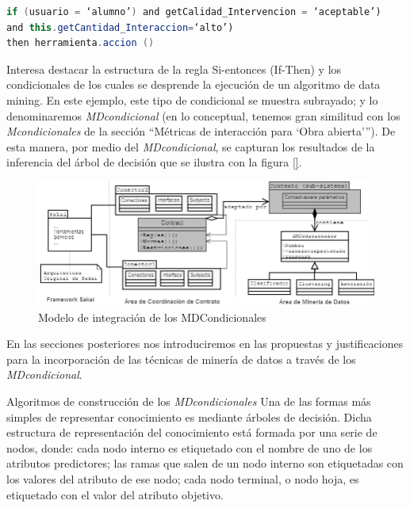 \begin{itemize}
\begin{lstlisting}[language=Java]
if (usuario = ‘alumno’) and getCalidad_Intervencion = ‘aceptable’)
and this.getCantidad_Interaccion=‘alto’)
then herramienta.accion ()
\end{lstlisting} 

Interesa destacar la estructura de la regla Si-entonces (If-Then) y los condicionales
de los cuales se desprende la ejecución de un algoritmo de data mining.
En este ejemplo, este tipo de condicional se muestra subrayado; y lo denominaremos
\textit{MDcondicional} (en lo conceptual, tenemos gran similitud con los
\textit{Mcondicionales} de la sección “Métricas de interacción para ‘Obra
abierta’”). De esta manera, por medio del \textit{MDcondicional}, se capturan
los resultados de la inferencia del árbol de decisión que se ilustra con la
figura \ref{}.

\begin{figure}
\begin{center}
 \includegraphics[width=6 in,totalheight=2 in]{Ch4/f3.png}
\end{center}
\caption{Modelo de integración de los MDCondicionales}
\end{figure}


En las secciones posteriores nos introduciremos en las propuestas y justificaciones
para la incorporación de las técnicas de minería de datos a través
de los \textit{MDcondicional}.

Algoritmos de construcción de los \textit{MDcondicionales} Una de las formas más
simples
de representar conocimiento es mediante árboles de decisión. Dicha estructura de
representación del conocimiento está formada por una serie de nodos, donde: cada
nodo interno es etiquetado con el nombre de uno de los atributos predictores;
las ramas que salen de un nodo interno son etiquetadas con los valores del
atributo de ese nodo; cada nodo terminal, o nodo hoja, es etiquetado con el
valor del atributo objetivo.


\end{itemize}
